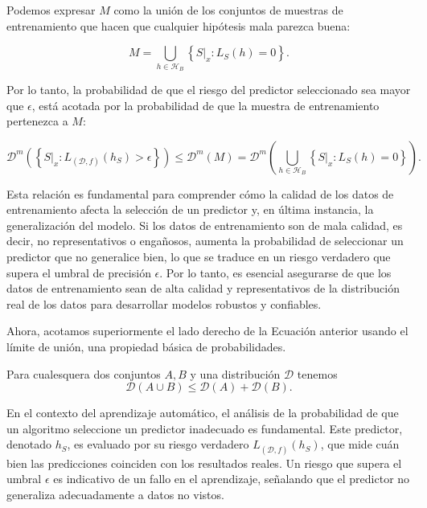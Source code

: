 Podemos expresar $M$ como la unión de los conjuntos de muestras de entrenamiento que hacen que cualquier hipótesis mala parezca buena:

\begin{equation}
M = \bigcup_{h \in \mathcal{H}_B}\left\{S|_x : L_S(h) = 0\right\}.
\end{equation}

Por lo tanto, la probabilidad de que el riesgo del predictor seleccionado sea mayor que $\epsilon$, está acotada por la probabilidad de que la muestra de entrenamiento pertenezca a $M$:

\begin{equation}
\mathcal{D}^m \left(\left\{S|_x: L_{(\mathcal{D},f)}(h_S) > \epsilon\right\}\right) \leq \mathcal{D}^m(M) = \mathcal{D}^m \left(\bigcup_{h \in \mathcal{H}_B}\left\{S|_x : L_S(h)=0\right\}\right).
\end{equation}

Esta relación es fundamental para comprender cómo la calidad de los datos de entrenamiento afecta la selección de un predictor y, en última instancia, la generalización del modelo. Si los datos de entrenamiento son de mala calidad, es decir, no representativos o engañosos, aumenta la probabilidad de seleccionar un predictor que no generalice bien, lo que se traduce en un riesgo verdadero que supera el umbral de precisión $\epsilon$. Por lo tanto, es esencial asegurarse de que los datos de entrenamiento sean de alta calidad y representativos de la distribución real de los datos para desarrollar modelos robustos y confiables.


Ahora, acotamos superiormente el lado derecho de la Ecuación anterior usando el límite de unión, una propiedad básica de probabilidades.

\begin{lema} Para cualesquera dos conjuntos $A,B$ y una distribución $\mathcal{D}$ tenemos
    $$\mathcal{D}(A\cup B) \leq \mathcal{D}(A) + \mathcal{D}(B).$$
\end{lema}


En el contexto del aprendizaje automático, el análisis de la probabilidad de que un algoritmo seleccione un predictor inadecuado es fundamental. Este predictor, denotado $h_S$, es evaluado por su riesgo verdadero $L_{(\mathcal{D},f)}(h_S)$, que mide cuán bien las predicciones coinciden con los resultados reales. Un riesgo que supera el umbral $\epsilon$ es indicativo de un fallo en el aprendizaje, señalando que el predictor no generaliza adecuadamente a datos no vistos.

